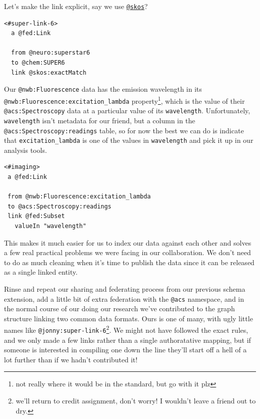 \documentclass[notoc]{tufte-book}
\begin{document}
Let's make the link explicit, say we use
\href{https://www.w3.org/2009/08/skos-reference/skos.html}{\texttt{@skos}}?

\begin{verbatim}
<#super-link-6>
  a @fed:Link
  
  from @neuro:superstar6
  to @chem:SUPER6
  link @skos:exactMatch
\end{verbatim}

Our \texttt{@nwb:Fluorescence} data has the emission wavelength in its
\texttt{@nwb:Fluorescence:excitation\_lambda} property\footnote{not
  really where it would be in the standard, but go with it plz}, which
is the value of their \texttt{@acs:Spectroscopy} data at a particular
value of its \texttt{wavelength}. Unfortunately, \texttt{wavelength}
isn't metadata for our friend, but a column in the
\texttt{@acs:Spectroscopy:readings} table, so for now the best we can do
is indicate that \texttt{excitation\_lambda} is one of the values in
\texttt{wavelength} and pick it up in our analysis tools.

\begin{verbatim}
<#imaging>
 a @fed:Link
 
 from @nwb:Fluorescence:excitation_lambda
 to @acs:Spectroscopy:readings
 link @fed:Subset
   valueIn "wavelength"
\end{verbatim}

This makes it much easier for us to index our data against each other
and solves a few real practical problems we were facing in our
collaboration. We don't need to do as much cleaning when it's time to
publish the data since it can be released as a single linked entity.

Rinse and repeat our sharing and federating process from our previous
schema extension, add a little bit of extra federation with the
\texttt{@acs} namespace, and in the normal course of our doing our
research we've contributed to the graph structure linking two common
data formats. Ours is one of many, with ugly little names like
\texttt{@jonny:super-link-6}\footnote{we'll return to credit assignment,
  don't worry! I wouldn't leave a friend out to dry.}. We might not have
followed the exact rules, and we only made a few links rather than a
single authoratative mapping, but if someone is interested in compiling
one down the line they'll start off a hell of a lot further than if we
hadn't contributed it!
\end{document}
